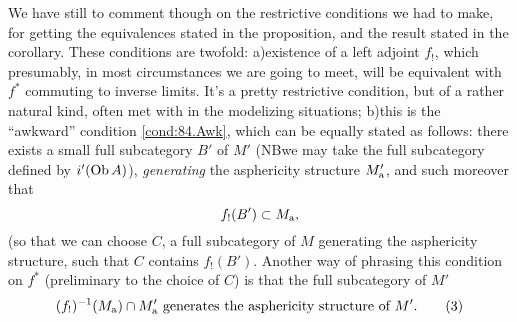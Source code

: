 We have still to comment though on the restrictive conditions we had
to make, for getting the equivalences stated in the proposition, and
the result stated in the corollary. These conditions are twofold:
a)\enspace existence of a left adjoint $f_!$, which presumably, in
most circumstances we are going to meet, will be equivalent with $f^*$
commuting to inverse limits. It's a pretty restrictive condition, but
of a rather natural kind, often met with in the modelizing situations;
b)\enspace this is the ``awkward'' condition \ref{cond:84.Awk}, which
can be equally stated as follows: there exists a small full
subcategory $B'$ of $M'$ (NB\enspace we may take the full subcategory
defined by $i'(\operatorname{Ob} A)$), \emph{generating} the asphericity structure
$M'_{\mathrm{a}}$, and such moreover that
\[f_!(B')\subset M_{\mathrm{a}},\]
(so that we can choose $C$, a full subcategory of $M$ generating the
asphericity structure, such that $C$ contains $f_!(B')$. Another way
of phrasing this condition on $f^*$ (preliminary to the choice of $C$)
is that the full subcategory of $M'$
\begin{equation}
  \label{eq:84.3}
  \text{$(f_!)^{-1}(M_{\mathrm{a}}) \mathbin{\cap} M'_{\mathrm{a}}$ generates the asphericity
    structure of $M'$.}\tag{3}
\end{equation}

